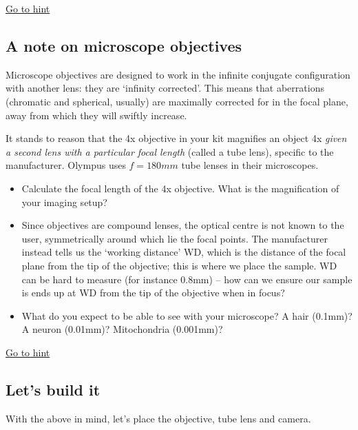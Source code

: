 \documentclass[a4paper]{report}
\begin{document}
    \noindent
	\hyperlink{hintTo-imaging}{Go to hint}
	
	\subsection{A note on microscope objectives}
	Microscope objectives are designed to work in the infinite conjugate configuration with another lens: they are `infinity corrected'. This means that aberrations (chromatic and spherical, usually) are maximally corrected for in the focal plane, away from which they will swiftly increase. 
	
	It stands to reason that the 4x objective in your kit magnifies an object 4x \emph{given a second lens with a particular focal length} (called a tube lens), specific to the manufacturer. Olympus uses $f=180mm$ tube lenses in their microscopes. 
	
	\begin{itemize}
	    \item Calculate the focal length of the 4x objective. What is the magnification of your imaging setup? 
	    \item Since objectives are compound lenses, the optical centre is not known to the user, symmetrically around which lie the focal points. The manufacturer instead tells us the `working distance' WD, which is the distance of the focal plane from the tip of the objective; this is where we place the sample. WD can be hard to measure (for instance 0.8mm) -- how can we ensure our sample is ends up at WD from the tip of the objective when in focus?   
	    \item What do you expect to be able to see with your microscope? A hair (0.1mm)? A neuron (0.01mm)? Mitochondria (0.001mm)?
	\end{itemize}

    \noindent
	\hyperlink{hintTo-imaging}{Go to hint}

    \subsection{Let's build it}
    With the above in mind, let's place the objective, tube lens and camera.
    
\end{document}
